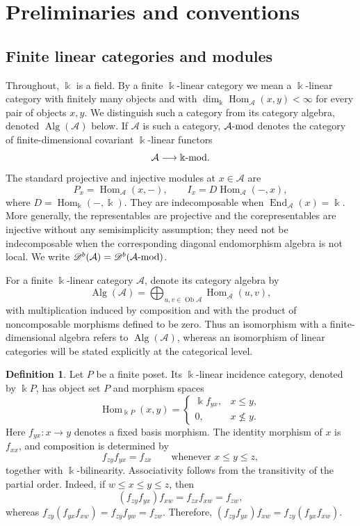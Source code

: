 \documentclass[12pt,a4paper,english,reqno]{amsart}
\theoremstyle{plain}
\theoremstyle{definition}
\newtheorem{definition}[theorem]{Definition}
\newcommand{\kk}{\Bbbk}
\newcommand{\Hom}{\operatorname{Hom}}
\newcommand{\End}{\operatorname{End}}
\newcommand{\modcat}{\ensuremath{\mbox{\rm -mod}}}
\newcommand{\Db}[1]{{\mathscr D}^b(#1)}
\begin{document}
\section{Preliminaries and conventions}
\label{sec:preliminaries}

\subsection{Finite linear categories and modules}

Throughout, $\kk$ is a field. By a finite $\kk$-linear category we
mean a $\kk$-linear category with finitely many objects and with
$\dim_{\kk}\Hom_{\mathcal A}(x,y)<\infty$ for every pair of objects
$x,y$. We distinguish such a category from its category algebra, denoted
$\operatorname{Alg}(\mathcal A)$ below. If $\mathcal A$ is such a category,
$\mathcal A\modcat$ denotes the category of finite-dimensional
covariant $\kk$-linear functors
\[
 \mathcal A\longrightarrow \kk\modcat.
\]
The standard projective and injective modules at $x\in\mathcal A$ are
\[
 P_x=\Hom_{\mathcal A}(x,-),\qquad
 I_x=D\Hom_{\mathcal A}(-,x),
\]
where $D=\Hom_{\kk}(-,\kk)$.  They are indecomposable when
$\End_{\mathcal A}(x)=\kk$.  More generally, the representables are
projective and the corepresentables are injective without any semisimplicity
assumption; they need not be indecomposable when the corresponding diagonal
endomorphism algebra is not local.  We write
$\Db{\mathcal A}=\Db{\mathcal A\modcat}$.

For a finite $\kk$-linear category $\mathcal A$, denote its category
algebra by
\begin{equation}
 \operatorname{Alg}(\mathcal A)
 =\bigoplus_{u,v\in\operatorname{Ob}\mathcal A} \Hom_{\mathcal A}(u,v),
\label{eq:category-algebra}
\end{equation}
with multiplication induced by composition and with the product of
noncomposable morphisms defined to be zero. Thus an isomorphism with a
finite-dimensional algebra refers to $\operatorname{Alg}(\mathcal A)$,
whereas an isomorphism of linear categories will be stated explicitly at the
categorical level.


\begin{definition}
Let $P$ be a finite poset. Its $\kk$-linear incidence category,
denoted by $\kk P$, has object set $P$ and morphism spaces
\[
\Hom_{\kk P}(x,y)=
\begin{cases}
\kk f_{yx},&x\leq y,\\
0,&x\nleq y.
\end{cases}
\]
Here $f_{yx}:x\to y$ denotes a fixed basis morphism. The identity
morphism of $x$ is $f_{xx}$, and composition is determined by
\[
f_{zy}f_{yx}=f_{zx}
\qquad\text{whenever }x\leq y\leq z,
\]
together with $\kk$-bilinearity.
Associativity follows from the transitivity of the partial order. Indeed,
if $w\leq x\leq y\leq z$, then
\[
(f_{zy}f_{yx})f_{xw}
=
f_{zx}f_{xw}
=
f_{zw},
\]
whereas $f_{zy}(f_{yx}f_{xw})=f_{zy}f_{yw}=f_{zw}$.
Therefore, $(f_{zy}f_{yx})f_{xw}=f_{zy}(f_{yx}f_{xw})$.
\end{definition}
\end{document}
